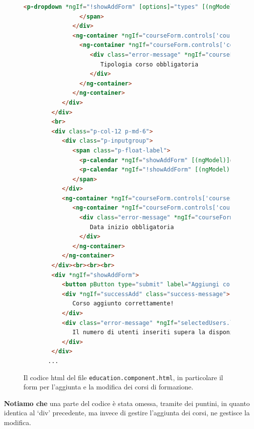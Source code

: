\begin{figure}[H]
\begin{lstlisting}[language=HTML, linewidth=20cm, basicstyle=\tiny]
                   <p-dropdown *ngIf="!showAddForm" [options]="types" [(ngModel)]="selectedType" placeholder="Seleziona tiopologia corso"  optionLabel="types" name="types" [style]="{ 'width': '100%' }" required></p-dropdown> <label>Seleziona tipologia corso     </label>
                </span>
              </div>
              <ng-container *ngIf="courseForm.controls['coursesType']">
                <ng-container *ngIf="courseForm.controls['coursesType'].invalid && (courseForm.controls['coursesType'].dirty || courseForm.controls['coursesType'].touched)">
                   <div class="error-message" *ngIf="courseForm.controls['coursesType'] .errors.required">
                      Tipologia corso obbligatoria
                   </div>
                </ng-container>
              </ng-container>
           </div>
        </div>
        <br>
        <div class="p-col-12 p-md-6">
           <div class="p-inputgroup">
              <span class="p-float-label">
                <p-calendar *ngIf="showAddForm" [(ngModel)]="course.coursesDate" name="date" dataType="string" dateFormat="dd/mm/yy" [showIcon] = "      true" required> </p-calendar>
                <p-calendar *ngIf="!showAddForm" [(ngModel)]="editedCourse.coursesDate" name="date" dataType="string" dateFormat="dd/mm/yy" [  showIcon]="true" required></p-calendar> <label>Data inizio corso </label>
              </span>
           </div>
           <ng-container *ngIf="courseForm.controls['coursesDate']">
              <ng-container *ngIf="courseForm.controls['coursesDate'].invalid && (courseForm.controls['coursesDate'].dirty || courseForm.controls['coursesDate'].touched)">
                <div class="error-message" *ngIf="courseForm.controls['coursesDate'] .errors.required">
                   Data inizio obbligatoria
                </div>
              </ng-container>
           </ng-container>
        </div><br><br><br>
        <div *ngIf="showAddForm">
           <button pButton type="submit" label="Aggiungi corso" class="p-button-rounded p-button-success" [disabled]="courseForm.invalid || selectedUsers.length > course.coursesCapacity"></button>
           <div *ngIf="successAdd" class="success-message">
              Corso aggiunto correttamente!
           </div>
           <div class="error-message" *ngIf="selectedUsers.length > course.coursesCapacity">
              Il numero di utenti inseriti supera la disponibilita' del corso
           </div>
        </div>
       ...
\end{lstlisting}
\caption{\label{fig:education form}Il codice \acrshort{html} del file \texttt{education.component.html}, in particolare il form per l'aggiunta e la modifica dei corsi di formazione.}
\end{figure}
\textbf{Notiamo che } una parte del codice è stata omessa, tramite dei puntini, in quanto identica al `div' precedente, ma invece di gestire l'aggiunta dei corsi, ne gestisce la modifica.\newline

